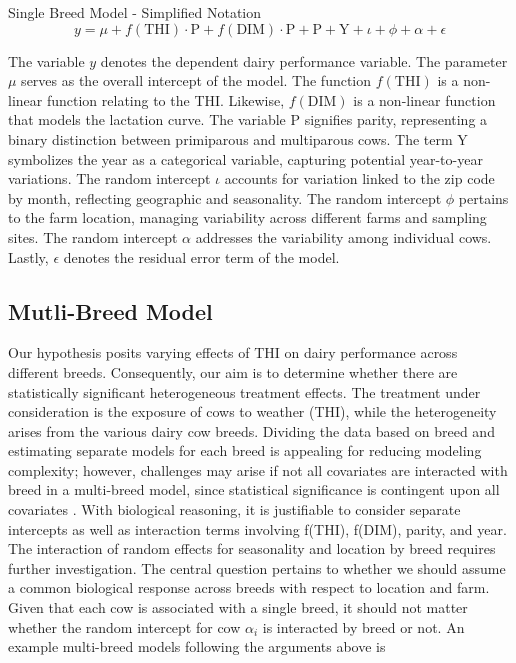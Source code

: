 \begin{defi} Single Breed Model - Simplified Notation
\begin{equation}\label{eq:single_breed_model}
y = \mu + f(\text{THI}) \cdot \text{P} + f(\text{DIM}) \cdot \text{P} + \text{P} + \text{Y} + \iota + \phi + \alpha + \epsilon
\end{equation}
\end{defi}
The variable $y$ denotes the dependent dairy performance variable. The parameter $\mu$ serves as the overall intercept of the model. The function $f(\text{THI})$ is a non-linear function relating to the THI. Likewise, $f(\text{DIM})$ is a non-linear function that models the lactation curve. The variable $\text{P}$ signifies parity, representing a binary distinction between primiparous and multiparous cows. The term $\text{Y}$ symbolizes the year as a categorical variable, capturing potential year-to-year variations. The random intercept $\iota$ accounts for variation linked to the zip code by month, reflecting geographic and seasonality. The random intercept $\phi$ pertains to the farm location, managing variability across different farms and sampling sites. The random intercept $\alpha$ addresses the variability among individual cows. Lastly, $\epsilon$ denotes the residual error term of the model.

\subsection{Mutli-Breed Model}\label{sec:multi_breed_model}
Our hypothesis posits varying effects of THI on dairy performance across different breeds. Consequently, our aim is to determine whether there are statistically significant heterogeneous treatment effects. The treatment under consideration is the exposure of cows to weather (THI), while the heterogeneity arises from the various dairy cow breeds. Dividing the data based on breed and estimating separate models for each breed is appealing for reducing modeling complexity; however, challenges may arise if not all covariates are interacted with breed in a multi-breed model, since statistical significance is contingent upon all covariates \citep{le_interaction_term_2020}. With biological reasoning, it is justifiable to consider separate intercepts as well as interaction terms involving f(THI), f(DIM), parity, and year. The interaction of random effects for seasonality and location by breed requires further investigation. The central question pertains to whether we should assume a common biological response across breeds with respect to location and farm. Given that each cow is associated with a single breed, it should not matter whether the random intercept for cow $\alpha_i$ is interacted by breed or not. An example multi-breed models following the arguments above is

